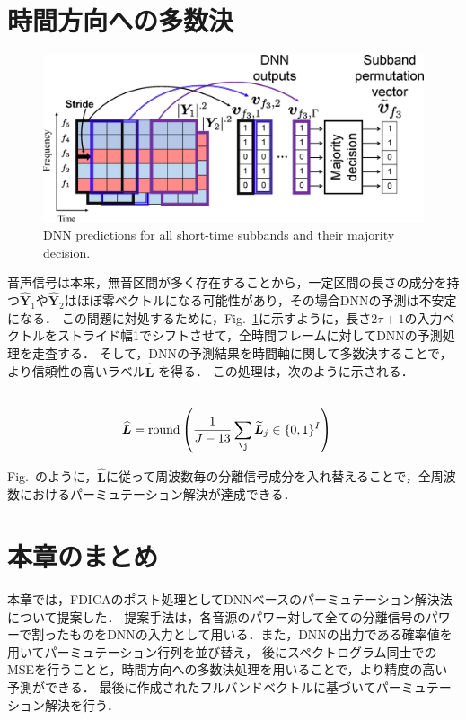 \section{時間方向への多数決}
\label{sec:maj}
\begin{figure}[t]
    \begin{center}
        \includegraphics[width=0.9\columnwidth]{figures/take_time_majority.eps}
    \end{center}
    \vspace{-15pt}
	\caption{DNN predictions for all short-time subbands and their majority decision.}
	\label{fig:take_time_majority}
	\vspace{-8pt}   %
\end{figure}
音声信号は本来，無音区間が多く存在することから，一定区間の長さの成分を持つ$\widehat{\bm{Y}}_1$や$\widehat{\bm{Y}}_2$はほぼ零ベクトルになる可能性があり，その場合DNNの予測は不安定になる．
この問題に対処するために，Fig.~\ref{fig:take_time_majority}に示すように，長さ$2\tau+1$の入力ベクトルをストライド幅1でシフトさせて，全時間フレームに対してDNNの予測処理を走査する．
そして，DNNの予測結果を時間軸に関して多数決することで，より信頼性の高いラベル$\widehat{\bm{L}}$ を得る．
この処理は，次のように示される．
\begin{align}
    \\\widehat{\bm{L}} &= \mathrm{round} \left(\frac{1}{J-13} \sum_{\j} \widetilde{\bm{L}}_{j} \in \{0, 1\}^{I} \right)\\
\end{align}

Fig.~{}のように，$\widehat{\bm{L}}$に従って周波数毎の分離信号成分を入れ替えることで，全周波数におけるパーミュテーション解決が達成できる．

\section{本章のまとめ}
\label{sec:3matome}
本章では，FDICAのポスト処理としてDNNベースのパーミュテーション解決法について提案した．
提案手法は，各音源のパワー対して全ての分離信号のパワーで割ったものをDNNの入力として用いる．また，DNNの出力である確率値を用いてパーミュテーション行列を並び替え，
後にスペクトログラム同士でのMSEを行うことと，時間方向への多数決処理を用いることで，より精度の高い予測ができる．
最後に作成されたフルバンドベクトルに基づいてパーミュテーション解決を行う．